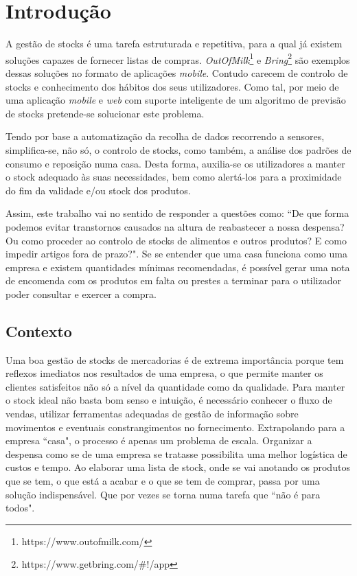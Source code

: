%
%
\chapter{Introdução} \label{cap1}

A gestão de stocks é uma tarefa estruturada e repetitiva, para a qual já existem soluções capazes de fornecer listas de compras. \textit{OutOfMilk}\footnote[1]{https://www.outofmilk.com/} e \textit{Bring}\footnote[2]{https://www.getbring.com/\#!/app} são exemplos dessas soluções no formato de aplicações \textit{mobile}. Contudo carecem de controlo de stocks e conhecimento dos hábitos dos seus utilizadores.  Como tal, por meio de uma aplicação \textit{mobile} e \textit{web} com suporte inteligente de um algoritmo de previsão de stocks pretende-se solucionar este problema.

Tendo por base a automatização da recolha de dados recorrendo a sensores, simplifica-se, não só, o controlo de stocks, como também, a análise dos padrões de consumo e reposição numa casa.
Desta forma, auxilia-se os utilizadores a manter o stock adequado às suas necessidades, bem como alertá-los para a proximidade do fim da validade e/ou stock dos produtos. 

Assim, este trabalho vai no sentido de responder a questões como: ``De que forma podemos evitar transtornos causados na altura de reabastecer a nossa despensa? Ou como proceder ao controlo de stocks de alimentos e outros produtos? E como impedir artigos fora de prazo?". Se se entender que uma casa funciona como uma empresa e existem quantidades mínimas recomendadas, é possível gerar uma nota de encomenda com os produtos em falta ou prestes a terminar para o utilizador poder consultar e exercer a compra.

%
%
\section{Contexto} \label{sec11}

Uma boa gestão de stocks de mercadorias é de extrema importância porque tem reflexos imediatos nos resultados de uma empresa, o que permite manter os clientes satisfeitos não só a nível da quantidade como da qualidade. Para manter o stock ideal não basta bom senso e intuição, é necessário conhecer o fluxo de vendas, utilizar ferramentas adequadas de gestão de informação sobre movimentos e eventuais constrangimentos no fornecimento. Extrapolando para a empresa ``casa", o processo é apenas um problema de escala. Organizar a despensa como se de uma empresa se tratasse possibilita uma melhor logística de custos e tempo. Ao elaborar uma lista de stock, onde se vai anotando os produtos que se tem, o que está a acabar e o que se tem de comprar, passa por uma solução indispensável. Que por vezes se torna numa tarefa que ``não é para todos".

